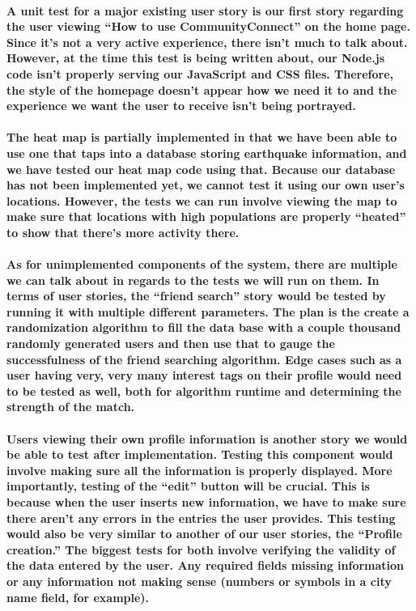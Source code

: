 \documentclass[12pt]{article}
\begin{document}
\paragraph{\normalfont \indent A unit test for a major existing user story is our first story regarding the user viewing “How to use CommunityConnect” on the home page. Since it’s not a very active experience, there isn’t much to talk about. However, at the time this test is being written about, our Node.js code isn’t properly serving our JavaScript and CSS files. Therefore, the style of the homepage doesn’t appear how we need it to and the experience we want the user to receive isn’t being portrayed.
}
\paragraph{\normalfont \indent  The heat map is partially implemented in that we have been able to use one that taps into a database storing earthquake information, and we have tested our heat map code using that. Because our database has not been implemented yet, we cannot test it using our own user’s locations. However, the tests we can run involve viewing the map to make sure that locations with high populations are properly “heated” to show that there’s more activity there.
}
\paragraph{\normalfont \indent  As for unimplemented components of the system, there are multiple we can talk about in regards to the tests we will run on them. In terms of user stories, the “friend search” story would be tested by running it with multiple different parameters. The plan is the create a randomization algorithm to fill the data base with a couple thousand randomly generated users and then use that to gauge the successfulness of the friend searching algorithm. Edge cases such as a user having very, very many interest tags on their profile would need to be tested as well, both for algorithm runtime and determining the strength of the match.
}
\paragraph{\normalfont \indent Users viewing their own profile information is another story we would be able to test after implementation. Testing this component would involve making sure all the information is properly displayed. More importantly, testing of the “edit” button will be crucial. This is because when the user inserts new information, we have to make sure there aren’t any errors in the entries the user provides. This testing would also be very similar to another of our user stories, the “Profile creation.” The biggest tests for both involve verifying the validity of the data entered by the user. Any required fields missing information or any information not making sense (numbers or symbols in a city name field, for example).
}
\end{document}
